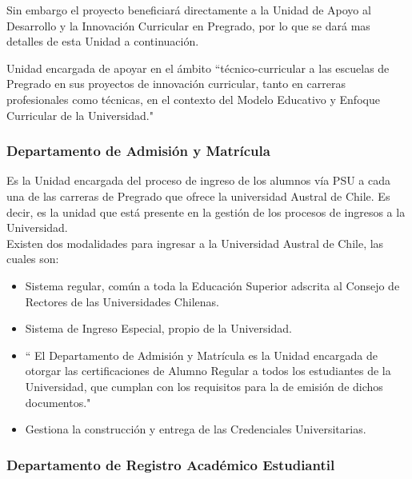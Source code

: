 		Sin embargo el proyecto beneficiará directamente  a la Unidad de Apoyo al Desarrollo y la Innovación Curricular en Pregrado, por lo que se dará mas detalles de esta Unidad a continuación.
		
		
		
		Unidad encargada de apoyar en el ámbito ``técnico-curricular a las escuelas de Pregrado en sus proyectos de innovación curricular, tanto en carreras profesionales como técnicas, en el contexto del Modelo Educativo y Enfoque Curricular de la Universidad."\hspace{0.2cm} \cite{Dac15}
		\subsubsection{Departamento de Admisión y Matrícula}
		Es la Unidad encargada del proceso de ingreso de los alumnos vía PSU a cada una de las carreras de Pregrado que ofrece la universidad Austral de Chile. Es decir, es la unidad que está presente en la gestión de los procesos de ingresos a la Universidad.\\
		
		Existen dos modalidades para ingresar a la Universidad Austral de Chile, las cuales son:
			\begin{itemize}
				\item Sistema regular, común a toda la Educación Superior adscrita al Consejo de Rectores de las Universidades Chilenas.
				\item Sistema de Ingreso Especial, propio de la Universidad.
			\end{itemize}
			
		
			\begin{itemize}
				\item 	`` El Departamento de Admisión y Matrícula es la Unidad encargada de otorgar las certificaciones de Alumno Regular a todos los estudiantes de la Universidad, que cumplan con los requisitos para la de emisión de dichos documentos."\hspace{0.2cm} \cite{Dep15}
				\item Gestiona  la construcción y entrega de las Credenciales Universitarias.
			\end{itemize}
			
		
		
		
		\subsubsection{Departamento de Registro Académico Estudiantil}
		
